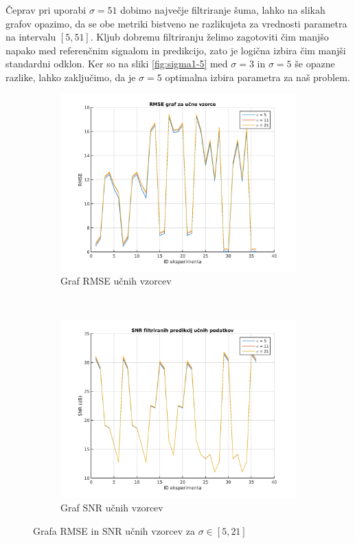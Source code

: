 Čeprav pri uporabi $\sigma=51$ dobimo največje filtriranje šuma, lahko na slikah grafov opazimo, da se obe metriki bistveno ne razlikujeta za vrednosti parametra na intervalu $[5,51]$. Kljub dobremu filtriranju želimo zagotoviti čim manjšo napako med referenčnim signalom in predikcijo, zato je logična izbira čim manjši standardni odklon. Ker so na sliki \ref{fig:sigma1-5} med $\sigma=3$ in $\sigma=5$ še opazne razlike, lahko zaključimo, da je $\sigma=5$ optimalna izbira parametra za naš problem. 


\begin{figure}[htb]
\centering
\begin{subfigure}[t]{0.45\columnwidth}
\includegraphics[width=\columnwidth]{./Slike/sigma-rmse5-21.png}
\caption{Graf RMSE  učnih vzorcev}
\label{fig:sigma-rmse5-21}
\end{subfigure}
~
\begin{subfigure}[t]{0.45\columnwidth}
\includegraphics[width=\columnwidth]{./Slike/sigma-snr5-21.png}
\caption{Graf SNR  učnih vzorcev}
\label{fig:sigma-snr5-21}
\end{subfigure}
\caption{Grafa RMSE in SNR učnih vzorcev za \mbox{$\sigma \in [5,21]$}}
\label{fig:sigma5-21}
\end{figure}



